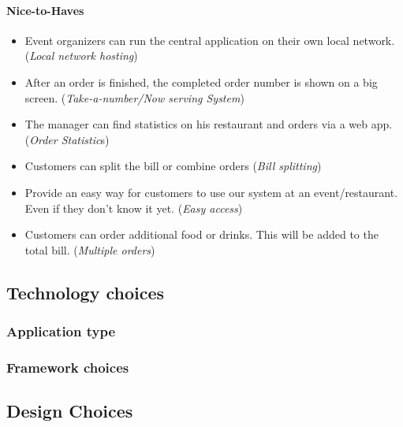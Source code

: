 \documentclass[12pt]{article}
\begin{document}
\paragraph{Nice-to-Haves}
\begin{itemize}
	\item Event organizers can run the central application on their own local network. 
	(\textit{Local network hosting})
	\item After an order is finished, the completed order number is shown on a big screen. 
	(\textit{Take-a-number/Now serving System})
	\item The manager can find statistics on his restaurant and orders via a web app. 
	(\textit{Order Statistic}s)
	\item Customers can split the bill or combine orders 
	(\textit{Bill splitting})
	\item Provide an easy way for customers to use our system at an event/restaurant. Even if they don’t know it yet. 
	(\textit{Easy access})
	\item Customers can order additional food or drinks. This will be added to the total bill.
	(\textit{Multiple orders})
	
\end{itemize}

\subsection{Technology choices}
\subsubsection{Application type}
\subsubsection{Framework choices}
\subsection{Design Choices}
\end{document}
